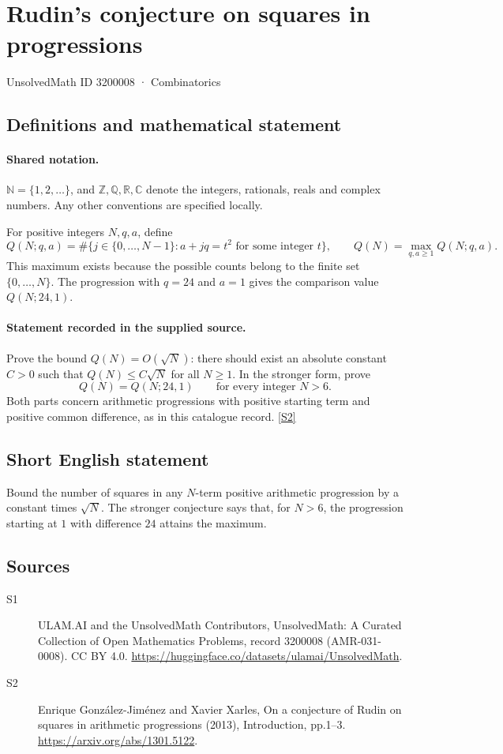 \documentclass[11pt]{article}
\newcommand{\sref}[2]{\hyperlink{source:#1:#2}{[S#2]}}
\begin{document}
\setcounter{section}{3200007}
\section{Rudin's conjecture on squares in progressions}\label{3200008}
{\small\sffamily UnsolvedMath ID 3200008 · Combinatorics}
\subsection{Definitions and mathematical statement}

\paragraph{Shared notation.}$\mathbb N=\{1,2,\ldots\}$, and $\mathbb Z,\mathbb Q,\mathbb R,\mathbb C$ denote the integers, rationals, reals and complex numbers. Any other conventions are specified locally.


For positive integers $N,q,a$, define
\[
Q(N;q,a)=\#\{j\in\{0,\ldots,N-1\}: a+jq=t^2\text{ for some integer }t\},
\qquad Q(N)=\max_{q,a\ge1}Q(N;q,a).
\]
This maximum exists because the possible counts belong to the finite set $\{0,\ldots,N\}$. The progression with $q=24$ and $a=1$ gives the comparison value $Q(N;24,1)$.
\paragraph{Statement recorded in the supplied source.}
Prove the bound $Q(N)=O(\sqrt N)$: there should exist an absolute constant $C>0$ such that $Q(N)\le C\sqrt N$ for all $N\ge1$. In the stronger form, prove
\[
Q(N)=Q(N;24,1)\qquad\text{for every integer }N>6.
\]
Both parts concern arithmetic progressions with positive starting term and positive common difference, as in this catalogue record. \sref{3200008}{2}
\subsection{Short English statement}
Bound the number of squares in any $N$-term positive arithmetic progression by a constant times $\sqrt N$. The stronger conjecture says that, for $N>6$, the progression starting at $1$ with difference $24$ attains the maximum.
\subsection{Sources}
\begin{description}
\item[\hypertarget{source:3200008:1}{S1}] ULAM.AI and the UnsolvedMath Contributors, UnsolvedMath: A Curated Collection of Open Mathematics Problems, record 3200008 (AMR-031-0008). CC BY 4.0. \url{https://huggingface.co/datasets/ulamai/UnsolvedMath}.
\item[\hypertarget{source:3200008:2}{S2}] Enrique González-Jiménez and Xavier Xarles, On a conjecture of Rudin on squares in arithmetic progressions (2013), Introduction, pp.1–3. \url{https://arxiv.org/abs/1301.5122}.
\end{description}
\label{end:3200008}
\end{document}

